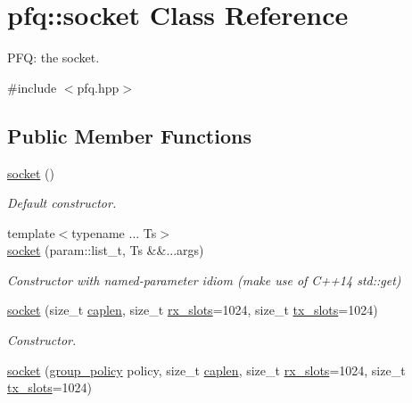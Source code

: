 \hypertarget{classpfq_1_1socket}{}\section{pfq\+:\+:socket Class Reference}
\label{classpfq_1_1socket}


P\+FQ\+: the socket.  




{\ttfamily \#include $<$pfq.\+hpp$>$}

\subsection*{Public Member Functions}
\begin{DoxyCompactItemize}
\item 
\hyperlink{classpfq_1_1socket_a169a46cd01a5fd0a71919ece48f18d9d}{socket} ()
\begin{DoxyCompactList}\small\item\em Default constructor. \end{DoxyCompactList}\item 
{\footnotesize template$<$typename ... Ts$>$ }\\\hyperlink{classpfq_1_1socket_aa53695f39b45a0fa9520d52a1a35d2bf}{socket} (param\+::list\+\_\+t, Ts \&\&...args)
\begin{DoxyCompactList}\small\item\em Constructor with named-\/parameter idiom (make use of C++14 std\+::get) \end{DoxyCompactList}\item 
\hyperlink{classpfq_1_1socket_ad0e09474a9919723dfdf142e2b1e5386}{socket} (size\+\_\+t \hyperlink{classpfq_1_1socket_ab68dbba5ef01041b9c96758c4a9f0a6c}{caplen}, size\+\_\+t \hyperlink{classpfq_1_1socket_a5cf700fc12d67b91df3d669ac4aa737a}{rx\+\_\+slots}=1024, size\+\_\+t \hyperlink{classpfq_1_1socket_a019d15a072c043d6a1333ca0c836da4c}{tx\+\_\+slots}=1024)
\begin{DoxyCompactList}\small\item\em Constructor. \end{DoxyCompactList}\item 
\hyperlink{classpfq_1_1socket_a419985e445525a7dbfae6d9ace452427}{socket} (\hyperlink{namespacepfq_ac41249c8510558905b01fa4d866a38d7}{group\+\_\+policy} policy, size\+\_\+t \hyperlink{classpfq_1_1socket_ab68dbba5ef01041b9c96758c4a9f0a6c}{caplen}, size\+\_\+t \hyperlink{classpfq_1_1socket_a5cf700fc12d67b91df3d669ac4aa737a}{rx\+\_\+slots}=1024, size\+\_\+t \hyperlink{classpfq_1_1socket_a019d15a072c043d6a1333ca0c836da4c}{tx\+\_\+slots}=1024)

\end{DoxyCompactItemize}
